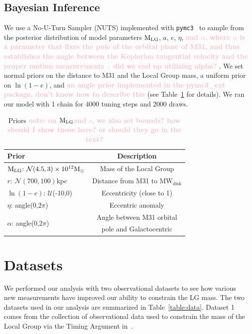 \documentclass[twocolumn]{aastex631}
\newcommand{\kc}[1]{\textcolor{pink}{\textbf{#1}} }
\newcommand{\mlg}{\ensuremath{\textrm{M}_{\rm LG}}}
\newcommand{\mwdisk}{\ensuremath{\textrm{MW}_\textrm{disk}}}
\begin{document}
\subsection{Bayesian Inference}

We use a No-U-Turn Sampler (NUTS) implemented with
\texttt{pymc3}~\citep{Salvatier2016} to sample from the posterior distribution
of model parameters \mlg, $a$, $e$, $\eta$, \kc{and $\alpha$, where $\alpha$ is
a parameter that fixes the pole of the orbital plane of M31, and thus
establishes the angle between the Keplerian tangential velocity and the proper
motion measurements -- did we end up utilizing alpha?}. We set normal priors on
the distance to M31 and the Local Group mass, a uniform prior on $\ln(1-e)$, and
\kc{an angle prior implemented in the pymc3\_ext package, don't know how to
describe this} (see Table~\ref{table:priors} for details). We ran our model with
1 chain for 4000 tuning steps and 2000 draws.







\begin{table}
  \centering
  \begin{tabular}{lc}
  \hline\hline
  Prior  & Description \\\hline
  \mlg: $\mathcal{N}(4.5,3)\times10^{12}\mathrm{M}_\odot$ & Mass of the Local Group\\
  $r$: $\mathcal{N}(700,100)$kpc & Distance from M31 to $\mwdisk$\\
  $\ln(1-e)$: $\mathcal{U}$(-10,0) & Eccentricity (close to 1) \\
  $\eta$: angle(0,2$\pi$)& Eccentric anomaly\\
  \multirow{2}{*}{$\alpha$: angle(0,2$\pi$)} & Angle between M31 orbital\\
  & pole and Galactocentric\\
  \hline\hline
  \end{tabular}
  \caption{\label{table:priors}Priors \kc{note: on \mlg and $r$, we also set bounds? how should I show those here? or should they go in the text?}}
\end{table}




\section{Datasets}
\label{sec:datasets}
We performed our analysis with two observational datasets to see how various
new measurements have improved our ability to constrain the LG mass.
The two datasets used in our analysis are summarized in Table~\ref{table:data}.
Dataset 1 comes from the collection of observational data used to constrain the
mass of the Local Group via the Timing Argument in~\cite{vdm2012}. 
\end{document}
